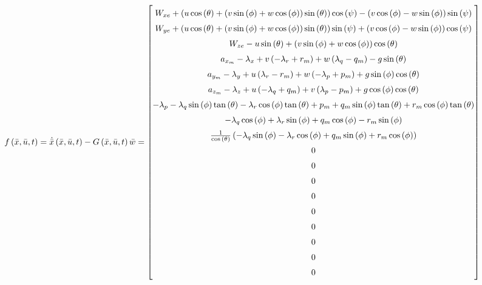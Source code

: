 \begin{equation}
    \arraycolsep=1.pt\def\arraystretch{1.5}
    f\left(\bar x, \bar u, t \right ) = 
    \dot{\bar x}\left( {\bar x,\bar u,t} \right) - G\left( {\bar x,\bar u,t} \right)\bar w =     
\left[\begin{matrix}W_{xe} + \left(u \cos{\left (\theta \right )} + \left(v \sin{\left (\phi \right )} + w \cos{\left (\phi \right )}\right) \sin{\left (\theta \right )}\right) \cos{\left (\psi \right )} - \left(v \cos{\left (\phi \right )} - w \sin{\left (\phi \right )}\right) \sin{\left (\psi \right )}\\
W_{ye} + \left(u \cos{\left (\theta \right )} + \left(v \sin{\left (\phi \right )} + w \cos{\left (\phi \right )}\right) \sin{\left (\theta \right )}\right) \sin{\left (\psi \right )} + \left(v \cos{\left (\phi \right )} - w \sin{\left (\phi \right )}\right) \cos{\left (\psi \right )}\\
W_{ze} - u \sin{\left (\theta \right )} + \left(v \sin{\left (\phi \right )} + w \cos{\left (\phi \right )}\right) \cos{\left (\theta \right )}\\
a_{x_m} - \lambda_{x} + v \left(- \lambda_{r} + r_{m}\right) + w \left(\lambda_{q} - q_{m}\right) - g \sin{\left (\theta \right )}\\a_{y_m} - \lambda_{y} + u \left(\lambda_{r} - r_{m}\right) + w \left(- \lambda_{p} + p_{m}\right) + g \sin{\left (\phi \right )} \cos{\left (\theta \right )}\\
a_{z_m} - \lambda_{z} + u \left(- \lambda_{q} + q_{m}\right) + v \left(\lambda_{p} - p_{m}\right) + g \cos{\left (\phi \right )} \cos{\left (\theta \right )}\\
- \lambda_{p} - \lambda_{q} \sin{\left (\phi \right )} \tan{\left (\theta \right )} - \lambda_{r} \cos{\left (\phi \right )} \tan{\left (\theta \right )} + p_{m} + q_{m} \sin{\left (\phi \right )} \tan{\left (\theta \right )} + r_{m} \cos{\left (\phi \right )} \tan{\left (\theta \right )}\\
- \lambda_{q} \cos{\left (\phi \right )} + \lambda_{r} \sin{\left (\phi \right )} + q_{m} \cos{\left (\phi \right )} - r_{m} \sin{\left (\phi \right )}\\
\frac{1}{\cos{\left (\theta \right )}} \left(- \lambda_{q} \sin{\left (\phi \right )} - \lambda_{r} \cos{\left (\phi \right )} + q_{m} \sin{\left (\phi \right )} + r_{m} \cos{\left (\phi \right )}\right)\\

0\\0\\0\\0\\0\\0\\0\\0\\0\end{matrix}\right]
\label{eq:iekf_f}
\end{equation}

